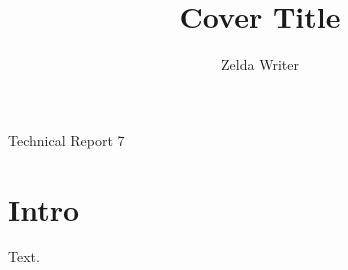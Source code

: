\documentclass{article}
\title{Cover Title}
\author{Zelda Writer}
\begin{document}
\begin{titlepage}
\centering Technical Report 7\par
\end{titlepage}
\begin{center}{\Large \@author\par}\end{center}
\section{Intro}
Text.
\end{document}
